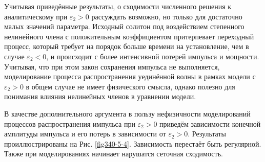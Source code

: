 \documentclass[14pt,a4paper]{extreport}
\begin{document}
			Учитывая приведённые результаты, о сходимости численного решения к аналитическому при \(\varepsilon_{2}>0\) рассуждать возможно, но только для достаточно малых значений параметра. Исходный солитон под воздействием степенного нелинейного члена с положительным коэффициентом притерпевает переходный процесс, который требует на порядок больше времени на установление, чем в случае \(\varepsilon_{2}<0\), и происходит с более интенсивной потерей импульса и мощности. Учитывая, что при этом закон сохранения импульса не выполняется, моделирование процесса распространения уединённой волны в рамках модели с \(\varepsilon_{2}>0\) в общем случае не имеет физического смысла, однако полезно для понимания влияния нелинейных членов в уравнении модели.

			В качестве дополнительного аргумента в пользу нефизичности моделирований процессов распространения импульса при \(\varepsilon_{2}>0\) приведём зависимости конечной амплитуды импульса и его потерь в зависимости от \(\varepsilon_{2}>0\). Результаты проиллюстрированы на Рис. \ref{fig340-5-4}. Зависимость перестаёт быть регулярной. Также при моделированиях начинает нарушатся сеточная сходимость.
\end{document}

